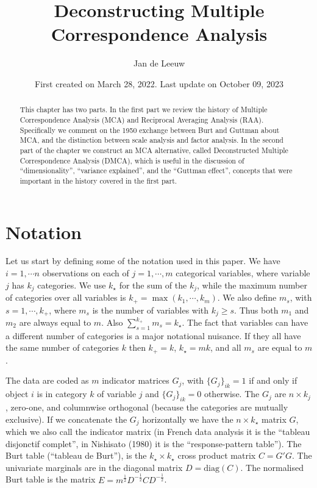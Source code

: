 \documentclass[
  12pt,
]{article}
\title{Deconstructing Multiple Correspondence Analysis}
\author{Jan de Leeuw}
\date{First created on March 28, 2022. Last update on October 09, 2023}
\begin{document}
\maketitle
\begin{abstract}
This chapter has two parts. In the first part we review the history of Multiple Correspondence Analysis (MCA) and Reciprocal Averaging Analysis (RAA). Specifically we comment on the 1950 exchange between Burt and Guttman about MCA, and the distinction between scale analysis and factor analysis. In the second part of the chapter we construct an MCA alternative, called Deconstructed Multiple Correspondence Analysis (DMCA), which is useful in the discussion of ``dimensionality'', ``variance explained'', and the ``Guttman effect'', concepts that were important in the history covered in the first part.
\end{abstract}

\section{Notation}\label{notation}

Let us start by defining some of the notation used in this paper. We have \(i=1,\cdots n\) observations on each of \(j=1,\cdots,m\) categorical variables, where variable \(j\) has \(k_j\) categories. We use \(k_\star\) for the sum of the \(k_j\), while the maximum number of categories over all variables is \(k_+=\max(k_1,\cdots,k_m)\). We also define \(m_s\), with \(s=1,\cdots,k_+\), where \(m_s\) is the number of variables with \(k_j\geq s\). Thus both \(m_1\) and \(m_2\) are always equal to \(m\). Also \(\sum_{s=1}^{k_+} m_s=k_\star\). The fact that variables can have a different number of categories is a major notational nuisance. If they
all have the same number of categories \(k\) then \(k_+=k\), \(k_\star=mk\),
and all \(m_s\) are equal to \(m\).

The data are coded as \(m\) indicator matrices \(G_j\), with \(\{G_j\}_{ik}=1\) if and only if object \(i\) is in category \(k\) of variable \(j\) and \(\{G_j\}_{ik}=0\) otherwise. The \(G_j\) are \(n\times k_j\), zero-one, and columnwise orthogonal (because the categories are mutually exclusive). If we concatenate the \(G_j\) horizontally we have the \(n\times k_\star\) matrix \(G\), which we also call the indicator matrix (in French data analysis it is the ``tableau disjonctif complet'', in Nishisato (1980) it is the ``response-pattern table''). The Burt table (``tableau de Burt''), is the \(k_\star\times k_\star\) cross product matrix \(C=G'G\). The univariate marginals are in the diagonal matrix \(D=\text{diag}(C)\). The normalised Burt table is the matrix \(E=m^{\frac12}D^{-\frac12}CD^{-\frac12}\).
\end{document}
